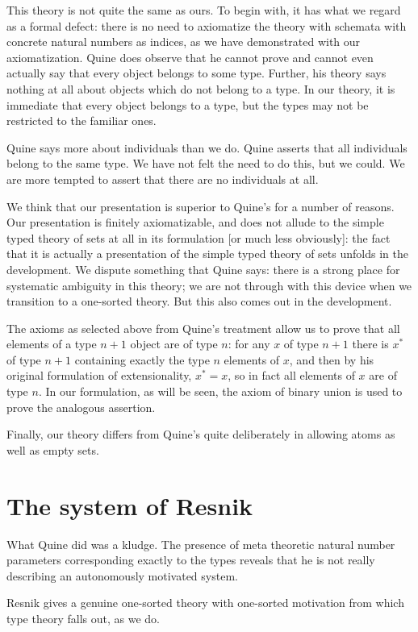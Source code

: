 \documentclass[12pt]{article}
\begin{document}
This theory is not quite the same as ours.  To begin with, it has what we regard as a formal defect:  there is no need to axiomatize the theory with schemata with concrete natural numbers as indices, as we have demonstrated with our axiomatization.  Quine does observe that he cannot prove and cannot even actually say that every object belongs to some type.  Further, his theory says nothing at all about objects which do not belong to a type. In our theory, it is immediate that every object belongs to a type, but the types may not be restricted to the familiar ones.

Quine says more about individuals than we do.  Quine asserts that all individuals belong to the same type.  We have not felt the need to do this, but we could.  We are more tempted to assert that there are no individuals at all.

We think that our presentation is superior to Quine's for a number of reasons.  Our presentation is finitely axiomatizable, and does not allude to the simple typed theory of sets at all in its formulation [or much less obviously]:  the fact that it is actually a presentation of the simple typed theory of sets unfolds in the development.  We dispute something that Quine says:  there is a strong place for systematic ambiguity in this theory; we are not through with this device when we transition to a one-sorted theory.  But this also comes out in the development.

The axioms as selected above from Quine's treatment allow us to prove that
all elements of a type $n+1$ object are of type $n$:  for any $x$ of type $n+1$ there
is $x^*$ of type $n+1$ containing exactly the type $n$ elements of $x$, and then by his original formulation of extensionality, $x^*=x$, so in fact all elements of $x$ are of type $n$.  In our formulation, as will be seen, the axiom of binary union is used to prove the analogous assertion.

Finally, our theory differs from Quine's quite deliberately in allowing atoms as well as empty sets.

\section{The system of Resnik}

What Quine did was a kludge.  The presence of meta theoretic natural number parameters corresponding exactly to the types
reveals that he is not really describing an autonomously motivated system.

Resnik gives a genuine one-sorted theory with one-sorted motivation from which type theory falls out, as we do.
\end{document}
